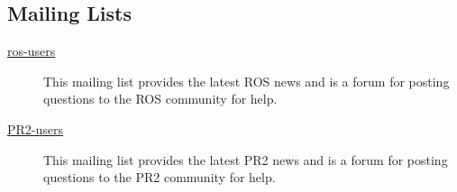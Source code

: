 \subsection{Mailing Lists}
\begin{description}
\item[\href{https://code.ros.org/mailman/listinfo/ros-users}{ros-users}] This mailing list 
provides the latest ROS news and is a forum for posting questions to the ROS community for help. 
\item[\href{http://lists.willowgarage.com/cgi-bin/mailman/listinfo/pr2-users}{PR2-users}] This 
mailing list provides the latest PR2 news and is a forum for posting questions to the PR2 community 
for help.
\end{description}
